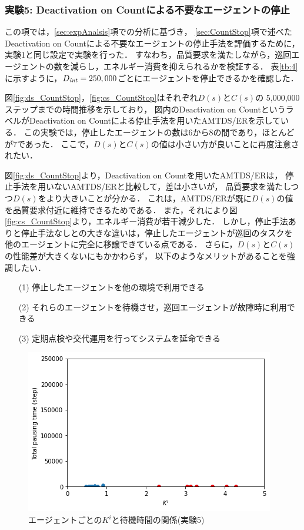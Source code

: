 \documentclass[12pt,a4j,twoside]{jarticle}
\def\DeactCheckInterval{D_{\it int}}
\begin{document}
  \subsubsection{実験5: Deactivation on Countによる不要なエージェントの停止}\label{ex:ER5}
  この項では，\ref{sec:expAnalsis}項での分析に基づき，
  \ref{sec:CountStop}項で述べたDeactivation on Countによる不要なエージェントの停止手法を評価するために，
  実験1と同じ設定で実験を行った．
  すなわち，品質要求を満たしながら，巡回エージェントの数を減らし，エネルギー消費を抑えられるかを検証する．
  表\ref{tb:4}に示すように，$\DeactCheckInterval=250,000$ごとにエージェントを停止できるかを確認した．
  \par

  図\ref{fig:ds_CountStop}，\ref{fig:cs_CountStop}はそれぞれ$D(s)$と$C(s)$の
  5,000,000ステップまでの時間推移を示しており，
  図内のDeactivation on CountというラベルがDeactivation on Countによる停止手法を用いたAMTDS/ERを示している．
  この実験では，停止したエージェントの数は6から8の間であり，ほとんどが7であった．
  ここで，$D(s)$と$C(s)$の値は小さい方が良いことに再度注意されたい．
  \par

  図\ref{fig:ds_CountStop}より，Deactivation on Countを用いたAMTDS/ERは，
  停止手法を用いないAMTDS/ERと比較して，差は小さいが，
  品質要求を満たしつつ$D(s)$をより大きいことが分かる．
  これは，AMTDS/ERが既に$D(s)$の値を品質要求付近に維持できるためである．
  また，それにより図\ref{fig:cs_CountStop}より，エネルギー消費が若干減少した．
  しかし，停止手法ありと停止手法なしとの大きな違いは，停止したエージェントが巡回のタスクを
  他のエージェントに完全に移譲できている点である．
  さらに，$D(s)$と$C(s)$の性能差が大きくないにもかかわらず，
  以下のようなメリットがあることを強調したい．
  \begin{enumerate}
    \item[(1)] 停止したエージェントを他の環境で利用できる
    \item[(2)] それらのエージェントを待機させ，巡回エージェントが故障時に利用できる
    \item[(3)] 定期点検や交代運用を行ってシステムを延命できる
  \end{enumerate}


  \begin{figure}
    \centering
    \includegraphics[width=0.8\hsize]{figures/CorrectionScatter_Office_CountStop.png}
    \caption{エージェントごとの$K^i$と待機時間の関係(実験5)}
    \label{fig:cscatter_CountStop_Office}
  \end{figure}
\end{document}

